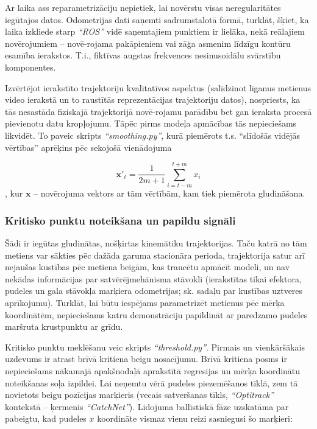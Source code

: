 \documentclass[12pt, a4paper]{article}
\numberwithin{equation}{section} %
\begin{document}
Ar laika ass reparametrizāciju nepietiek, lai novērstu visas neregularitātes iegūtajos datos. Odometrijas dati saņemti sadrumstalotā formā, turklāt, šķiet, ka laika izkliede starp \textit{``ROS''} vidē saņemtajiem punktiem ir lielāka, nekā reālajiem novērojumiem -- novē-rojama pakāpieniem vai zāģa asmenim līdzīgu kontūru esamība ierakstos. T.i., fiktīvas augstas frekvences nesinusoidālu svārstību komponentes. 

Izvērtējot ierakstīto trajektoriju kvalitatīvos aspektus (salīdzinot līganus metienus video ierakstā un to raustītās reprezentācijas trajektoriju datos), nospriests, ka tās nesastāda fiziskajā trajektorijā novē-rojamu parādību bet gan ieraksta procesā pievienotu datu kropļojumu. Tāpēc pirms modeļa apmācības tās nepieciešams likvidēt. To paveic skripts \textit{``smoothing.py''}, kurā piemērots t.s. ``slīdošās vidējās vērtības'' aprēķins pēc sekojošā vienādojuma

\begin{equation}
     \boldsymbol{x}'_{t} = \frac{1}{2m+1} \sum_{i=t-m}^{t+m}  x_i
\end{equation}
, kur $ \boldsymbol{x}$ -- novērojuma vektors ar tām vērtībām, kam tiek piemērota gludināšana.

\subsubsection{Kritisko punktu noteikšana un papildu signāli}

Šādi ir iegūtas gludinātas, nošķirtas kinemātiku trajektorijas. Taču katrā no tām metiens var sākties pēc dažāda garuma stacionāra perioda, trajektorija satur arī nejaušas kustības pēc metiena beigām, kas traucētu apmācīt modeli, un nav nekādas informācijas par satvērējmehānisma stāvokli (ierakstītas tikai efektora, pudeles un gala stāvokļa marķiera odometrijas; sk. sadaļu par kustības uztveres aprīkojumu). Turklāt, lai būtu iespējams parametrizēt metienus pēc mērķa koordinātēm, nepieciešams katru demonstrāciju papildināt ar paredzamo pudeles maršruta krustpunktu ar grīdu. 

Kritisko punktu meklēšanu veic skripts \textit{``threshold.py''}. Pirmais un vienkāršākais uzdevums ir atrast brīvā kritiena beigu nosacījumu. Brīvā kritiena posms ir nepieciešams nākamajā apakšnodaļā aprakstītā regresijas un mērķa koordinātu noteikšanas soļa izpildei. Lai neņemtu vērā pudeles piezemēšanos tīklā, zem tā novietots beigu pozīcijas marķieris (vecais satveršanas tīkls, \textit{``Optitrack''} kontekstā -- ķermenis \textit{``CatchNet''}). Lidojuma ballistiskā fāze uzskatāma par pabeigtu, kad pudeles $x$ koordināte vismaz vienu reizi sasniegusi šo marķieri:
\end{document}
